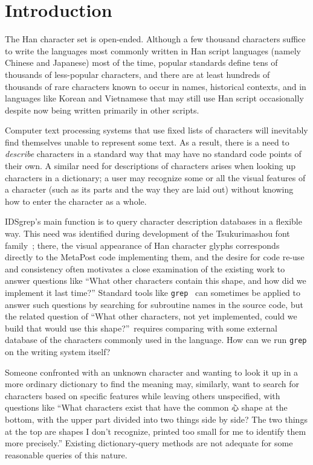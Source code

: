 \documentclass[twocolumn]{report}
\begin{document}
\chapter{Introduction}

\noindent
The Han character set is open-ended.  Although a few thousand characters
suffice to write the languages most commonly written in Han script languages
(namely Chinese and Japanese) most of the time, popular standards define
tens of thousands of less-popular characters, and there are at least
hundreds of thousands of rare characters known to occur in names, historical
contexts, and in languages like Korean and Vietnamese that may still use Han
script occasionally despite now being written primarily in other scripts.

Computer text processing systems that use fixed lists of characters will
inevitably find themselves unable to represent some text.  As a result,
there is a need to \emph{describe} characters in a standard way that may
have no standard code points of their own.  A similar need for descriptions
of characters arises when looking up characters in a dictionary; a user may
recognize some or all the visual features of a character (such as its parts
and the way they are laid out) without knowing how to enter the character as
a whole.

IDSgrep's main function is to query character description databases in a
flexible way.  This need was identified during development of the
Tsukurimashou font family~\cite{Tsukurimashou}; there, the visual appearance
of Han character glyphs corresponds directly to the MetaPost code
implementing them, and the desire for code re-use and consistency often
motivates a close examination of the existing work to answer questions like
``What other characters contain this shape, and how did we implement it last
time?'' Standard tools like \texttt{grep}~\cite{grep} can sometimes be
applied to answer such questions by searching for subroutine names in the
source code, but the related question of ``What other characters, not yet
implemented, could we build that would use this shape?''\ requires comparing
with some external database of the characters commonly used in the language. 
How can we run \texttt{grep} on the writing system itself?

Someone confronted with an unknown character and wanting to look it up in a
more ordinary dictionary to find the meaning may, similarly, want to search
for characters based on specific features while leaving others unspecified,
with questions like ``What characters exist that have the common \texttt{心}
shape at the bottom, with the upper part divided into two things side by
side?  The two things at the top are shapes I don't recognize, printed too
small for me to identify them more precisely.'' Existing dictionary-query
methods are not adequate for some reasonable queries of this nature.
\end{document}
